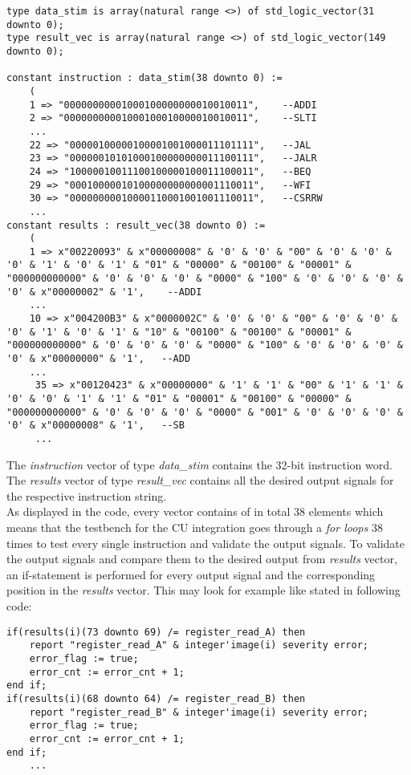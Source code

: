 \begin{lstlisting}[style=vhdl, caption=CU top testbench package]
type data_stim is array(natural range <>) of std_logic_vector(31 downto 0);
type result_vec is array(natural range <>) of std_logic_vector(149 downto 0);

constant instruction : data_stim(38 downto 0) :=
	(
	1 => "00000000001000100000000010010011",    --ADDI
	2 => "00000000001000100010000010010011",    --SLTI
	...
	22 => "00000100000100001001000011101111",   --JAL
	23 => "00000010101000100000000011100111",   --JALR
	24 => "10000010011100100000100011100011",   --BEQ
	29 => "00010000010100000000000001110011",   --WFI
	30 => "00000000010000110001001001110011",   --CSRRW
	...
constant results : result_vec(38 downto 0) :=
	(
	1 => x"00220093" & x"00000008" & '0' & '0' & "00" & '0' & '0' & '0' & '1' & '0' & '1' & "01" & "00000" & "00100" & "00001" & "000000000000" & '0' & '0' & '0' & "0000" & "100" & '0' & '0' & '0' & '0' & x"00000002" & '1',    --ADDI
	...
	10 => x"004200B3" & x"0000002C" & '0' & '0' & "00" & '0' & '0' & '0' & '1' & '0' & '1' & "10" & "00100" & "00100" & "00001" & "000000000000" & '0' & '0' & '0' & "0000" & "100" & '0' & '0' & '0' & '0' & x"00000000" & '1',   --ADD
	...
	 35 => x"00120423" & x"00000000" & '1' & '1' & "00" & '1' & '1' & '0' & '0' & '1' & '1' & "01" & "00001" & "00100" & "00000" & "000000000000" & '0' & '0' & '0' & "0000" & "001" & '0' & '0' & '0' & '0' & x"00000008" & '1',   --SB
	 ...
\end{lstlisting}
The \textit{instruction} vector of type \textit{data\_stim} contains the 32-bit instruction word. The \textit{results} vector of type \textit{result\_vec} contains all the desired output signals for the respective instruction string. \\
 As displayed in the code, every vector contains of in total 38 elements which means that the testbench for the CU integration goes through a \textit{for loops} 38 times to test every single instruction and validate the output signals. 
 To validate the output signals and compare them to the desired output from \textit{results} vector, an if-statement is performed for every output signal and the corresponding position in the \textit{results} vector. This may look for example like stated in following code:
 \begin{lstlisting}[style=vhdl, caption=CU top testbench output validation]
if(results(i)(73 downto 69) /= register_read_A) then
	report "register_read_A" & integer'image(i) severity error;
	error_flag := true;
	error_cnt := error_cnt + 1;
end if;  
if(results(i)(68 downto 64) /= register_read_B) then
	report "register_read_B" & integer'image(i) severity error;
	error_flag := true;
	error_cnt := error_cnt + 1;
end if;  
 	...
 \end{lstlisting}
